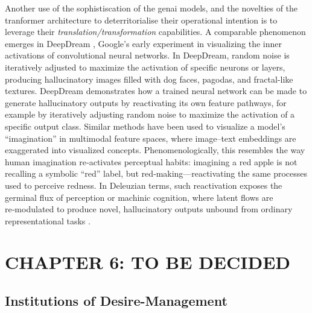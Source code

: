 Another use of the sophistiscation of the \gls{genai} models, and the novelties
of the tranformer architecture to deterritorialise their operational intention
is to leverage their \textit{translation/transformation} capabilities. A comparable phenomenon emerges in DeepDream \parencite[]{mordvintsev2015, beckmann2023}, Google’s early experiment in visualizing the inner activations of convolutional neural networks. In DeepDream, random noise is iteratively adjusted to maximize the activation of specific neurons or layers, producing hallucinatory images filled with dog faces, pagodas, and fractal-like textures. DeepDream \parencite[]{mordvintsev2015} demonstrates how a trained neural network can be made to generate hallucinatory outputs by reactivating its own feature pathways, for example by iteratively adjusting random noise to maximize the activation of a specific output class. Similar methods have been used to visualize a model’s “imagination” in multimodal feature spaces, where image–text embeddings are exaggerated into visualized concepts. Phenomenologically, this resembles the way human imagination re‑activates perceptual habits: imagining a red apple is not recalling a symbolic “red” label, but red‑making—reactivating the same processes used to perceive redness. In Deleuzian terms, such reactivation exposes the germinal flux of perception or machinic cognition, where latent flows are re‑modulated to produce novel, hallucinatory outputs unbound from ordinary representational tasks \parencite[415-416]{beckmann2023}.








\noindent\makebox[\linewidth]{\rule{\paperwidth}{0.4pt}}

\section{CHAPTER 6: TO BE DECIDED}

\subsection{Institutions of Desire-Management}\label{sec:desiring-institutions}

